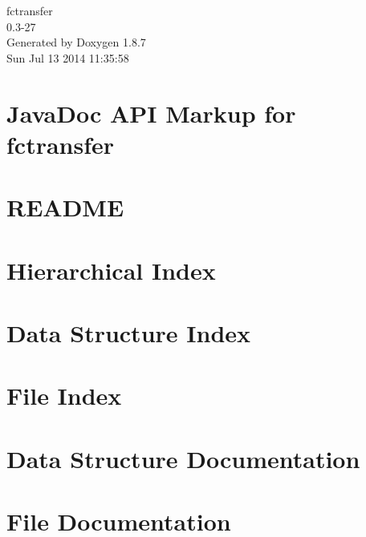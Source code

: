 \documentclass[twoside]{book}
\newcommand{\+}{\discretionary{\mbox{\scriptsize$\hookleftarrow$}}{}{}}
\newcommand{\clearemptydoublepage}{%
  \newpage{\pagestyle{empty}\cleardoublepage}%
}
\begin{document}
\begin{titlepage}
\vspace*{7cm}
\begin{center}%
{\Large fctransfer \\[1ex]\large 0.\+3-\/27 }\\
\vspace*{1cm}
{\large Generated by Doxygen 1.8.7}\\
\vspace*{0.5cm}
{\small Sun Jul 13 2014 11:35:58}\\
\end{center}
\end{titlepage}
\clearemptydoublepage
\tableofcontents
\clearemptydoublepage
{}

\chapter{Java\+Doc A\+P\+I Markup for fctransfer}
\label{index}
\chapter{R\+E\+A\+D\+M\+E}
\label{md_htdocs_README}

\chapter{Hierarchical Index}

\chapter{Data Structure Index}

\chapter{File Index}

\chapter{Data Structure Documentation}












\chapter{File Documentation}






\newpage
{}
{}
\printindex
\end{document}
